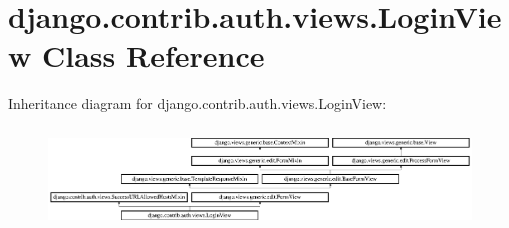 \hypertarget{classdjango_1_1contrib_1_1auth_1_1views_1_1_login_view}{}\section{django.\+contrib.\+auth.\+views.\+Login\+View Class Reference}
\label{classdjango_1_1contrib_1_1auth_1_1views_1_1_login_view}
Inheritance diagram for django.\+contrib.\+auth.\+views.\+Login\+View\+:\begin{figure}[H]
\begin{center}
\leavevmode
\includegraphics[height=2.697495cm]{classdjango_1_1contrib_1_1auth_1_1views_1_1_login_view}
\end{center}
\end{figure}
